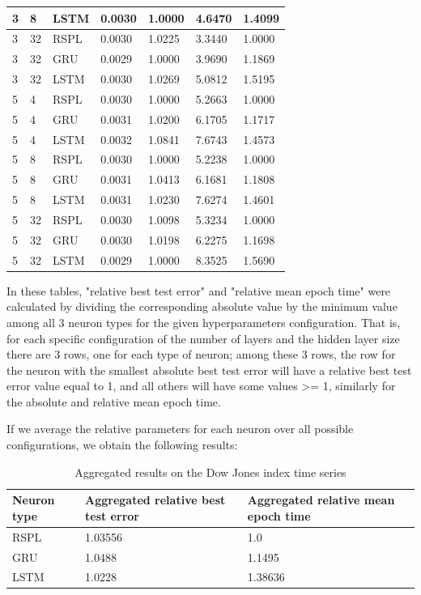 \documentclass[sn-apa]{sn-jnl}%
\begin{document}
\begin{table}[H]
\begin{tabular}{|p{1.4cm}|p{1.4cm}|p{1.4cm}|p{1.5cm}|p{2.5cm}|p{1.9cm}|p{2cm}|}
\hline
3 &   8 &  LSTM & 0.0030 & 1.0000 & 4.6470 &  1.4099 \\
\hline
3 &  32 &   RSPL & 0.0030 & 1.0225 & 3.3440 &  1.0000 \\
\hline
3 &  32 &   GRU & 0.0029 & 1.0000 & 3.9690 &  1.1869 \\
\hline
3 &  32 &  LSTM & 0.0030 & 1.0269 & 5.0812 &  1.5195 \\
\hline
5 &   4 &   RSPL & 0.0030 & 1.0000 & 5.2663 &  1.0000 \\
\hline
5 &   4 &   GRU & 0.0031 & 1.0200 & 6.1705 &  1.1717 \\
\hline
5 &   4 &  LSTM & 0.0032 & 1.0841 & 7.6743 &  1.4573 \\
\hline
5 &   8 &   RSPL & 0.0030 & 1.0000 & 5.2238 &  1.0000 \\
\hline
5 &   8 &   GRU & 0.0031 & 1.0413 & 6.1681 &  1.1808 \\
\hline
5 &   8 &  LSTM & 0.0031 & 1.0230 & 7.6274 &  1.4601 \\
\hline
5 &  32 &   RSPL & 0.0030 & 1.0098 & 5.3234 &  1.0000 \\
\hline
5 &  32 &   GRU & 0.0030 & 1.0198 & 6.2275 &  1.1698 \\
\hline
5 &  32 &  LSTM & 0.0029 & 1.0000 & 8.3525 &  1.5690 \\
\hline
\end{tabular}
\end{table}

In these tables, "relative best test error" and "relative mean epoch time" were calculated by dividing the corresponding absolute value by the minimum value among all 3 neuron types for the given hyperparameters configuration. That is, for each specific configuration of the number of layers and the hidden layer size there are 3 rows, one for each type of neuron; among these 3 rows, the row for the neuron with the smallest absolute best test error will have a relative best test error value equal to 1, and all others will have some values >= 1, similarly for the absolute and relative mean epoch time. 

If we average the relative parameters for each neuron over all possible configurations, we obtain the following results: 

\begin{table}[H]
\caption{Aggregated results on the Dow Jones index time series}
\begin{tabular}{ |p{2.2cm}|p{5cm}|p{5cm}| }
 \hline
  Neuron type & Aggregated relative best test error & Aggregated relative mean epoch time \\
  \hline
 RSPL & 1.03556 & 1.0 \\
 \hline  
 GRU & 1.0488 & 1.1495 \\
 \hline 
 LSTM & 1.0228 & 1.38636 \\
 \hline
\end{tabular}
\end{table}
\end{document}
